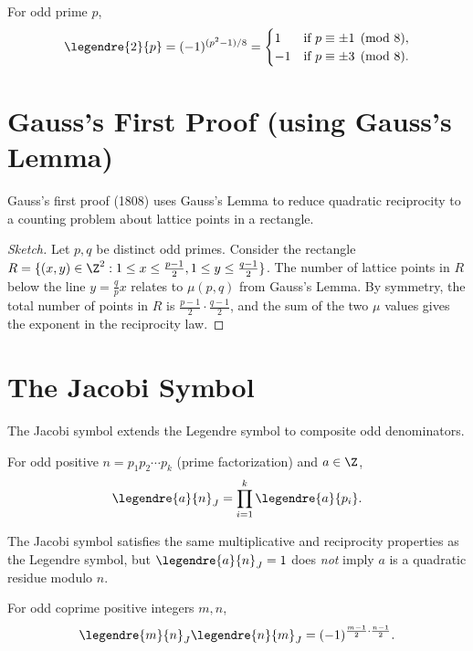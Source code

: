 \begin{supplement}
For odd prime $p$,
\[
\legendre{2}{p} = (-1)^{(p^2-1)/8} = 
\begin{cases}
1 & \text{if } p \equiv \pm 1 \pmod{8}, \\
-1 & \text{if } p \equiv \pm 3 \pmod{8}.
\end{cases}
\]
\end{supplement}

\section{Gauss's First Proof (using Gauss's Lemma)}

Gauss's first proof (1808) uses Gauss's Lemma to reduce quadratic reciprocity to a counting problem about lattice points in a rectangle.

\begin{proof}[Sketch]
Let $p, q$ be distinct odd primes. Consider the rectangle $R = \{(x,y) \in \Z^2 : 1 \le x \le \frac{p-1}{2}, 1 \le y \le \frac{q-1}{2}\}$. The number of lattice points in $R$ below the line $y = \frac{q}{p}x$ relates to $\mu(p,q)$ from Gauss's Lemma. By symmetry, the total number of points in $R$ is $\frac{p-1}{2} \cdot \frac{q-1}{2}$, and the sum of the two $\mu$ values gives the exponent in the reciprocity law.
\end{proof}

\section{The Jacobi Symbol}

The Jacobi symbol extends the Legendre symbol to composite odd denominators.

\begin{definition}
For odd positive $n = p_1 p_2 \cdots p_k$ (prime factorization) and $a \in \Z$,
\[
\legendre{a}{n}_J = \prod_{i=1}^k \legendre{a}{p_i}.
\]
\end{definition}

The Jacobi symbol satisfies the same multiplicative and reciprocity properties as the Legendre symbol, but $\legendre{a}{n}_J = 1$ does \textit{not} imply $a$ is a quadratic residue modulo $n$.

\begin{theorem}
For odd coprime positive integers $m, n$,
\[
\legendre{m}{n}_J \legendre{n}{m}_J = (-1)^{\frac{m-1}{2} \cdot \frac{n-1}{2}}.
\]
\end{theorem}

